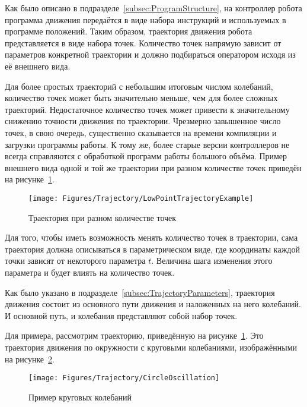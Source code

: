 Как было описано в подразделе~\ref{subsec:ProgramStructure}, на контроллер робота программа движения передаётся в виде набора инструкций и используемых в программе положений.
Таким образом, траектория движения робота представляется в виде набора точек.
Количество точек напрямую зависит от параметров конкретной траектории и должно подбираться оператором исходя из её внешнего вида.

Для более простых траекторий с небольшим итоговым числом колебаний, количество точек может быть значительно меньше, чем для более сложных траекторий.
Недостаточное количество точек может привести к значительному снижению точности движения по траектории.
Чрезмерно завышенное число точек, в свою очередь, существенно сказывается на времени компиляции и загрузки программы работы.
К тому же, более старые версии контроллеров не всегда справляются с обработкой программ работы большого объёма.
Пример внешнего вида одной и той же траектории при разном количестве точек приведён на рисунке~\ref{fig:Trajectory:LowPointTrajectoryExample}.

\begin{figure}[H]
    \centering
    \vspace{14pt}
    \texttt{[image: Figures/Trajectory/LowPointTrajectoryExample]}
    \caption{Траектория при разном количестве точек}
    \label{fig:Trajectory:LowPointTrajectoryExample}
\end{figure}

Для того, чтобы иметь возможность менять количество точек в траектории, сама траектория должна описываться в параметрическом виде, где координаты каждой точки зависят от некоторого параметра $t$.
Величина шага изменения этого параметра и будет влиять на количество точек.

Как было указано в подразделе~\ref{subsec:TrajectoryParameters}, траектория движения состоит из основного пути движения и наложенных на него колебаний.
И основной путь, и колебания представляют собой набор точек.

Для примера, рассмотрим траекторию, приведённую на рисунке~\ref{fig:Trajectory:LowPointTrajectoryExample}.
Это траектория движения по окружности с круговыми колебаниями, изображёнными на рисунке~\ref{fig:Trajectory:CircleOscillation}.

\begin{figure}[H]
    \centering
    \vspace{14pt}
    \texttt{[image: Figures/Trajectory/CircleOscillation]}
    \caption{Пример круговых колебаний}
    \label{fig:Trajectory:CircleOscillation}
\end{figure}

